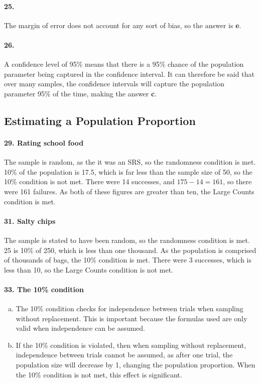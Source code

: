 \documentclass[12pt, A4]{article}
\begin{document}
		\paragraph{25.} 
			The margin of error does not account for any sort of bias, so the answer is \textbf{e}.
		\paragraph{26.}
			A confidence level of 95\% means that there is a 95\% chance of the population parameter being captured in the confidence interval. It can therefore be said that over many samples, the confidence intervals will capture the population parameter 95\% of the time, making the answer \textbf{c}.
	\subsection{Estimating a Population Proportion}
		\paragraph{29. Rating school food} 
			The sample is random, as the it was an SRS, so the randomness condition is met. 			10\% of the population is 17.5, which is far less than the sample size of 50, so the 10\% condition is not met.
			There were 14 successes, and $175 - 14 = 161$, so there were 161 failures. As both of these figures are greater than ten, the Large Counts condition is met.
		\paragraph{31. Salty chips}
			The sample is stated to have been random, so the randomness condition is met.
			25 is 10\% of 250, which is less than one thousand. As the population is comprised of thousands of bags, the 10\% condition is met.
			There were 3 successes, which is less than 10, so the Large Counts condition is not met.
		\paragraph{33. The 10\% condition}
			\begin{enumerate}[a.]
				\item 
					The 10\% condition checks for independence between trials when sampling without replacement. This is important because the formulas used are only valid when independence can be assumed.
				\item
					If the 10\% condition is violated, then when sampling without replacement, independence between trials cannot be assumed, as after one trial, the population size will decrease by 1, changing the population proportion. When the 10\% condition is not met, this effect is significant.
			\end{enumerate}
\end{document}
